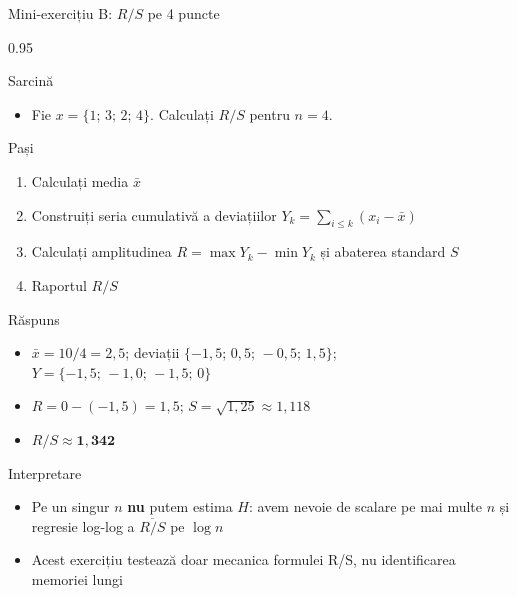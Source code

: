 \documentclass[9pt, aspectratio=169, t]{beamer}
\begin{document}
\begin{frame}[shrink=25]{Mini-exercițiu B: $R/S$ pe 4 puncte}
\begin{cminipage}{0.95\textwidth}
\begin{block}{Sarcină}
\begin{itemize}\setlength{\itemsep}{0pt}
    \item Fie $x=\{1;\,3;\,2;\,4\}$. Calculați $R/S$ pentru $n=4$.
\end{itemize}
\end{block}
\begin{block}{Pași}
\begin{enumerate}\setlength{\itemsep}{0pt}
    \item Calculați media $\bar x$
    \item Construiți seria cumulativă a deviațiilor $Y_k=\sum_{i\leq k}(x_i-\bar x)$
    \item Calculați amplitudinea $R=\max Y_k-\min Y_k$ și abaterea standard $S$
    \item Raportul $R/S$
\end{enumerate}
\end{block}
\begin{exampleblock}{Răspuns}
\begin{itemize}\setlength{\itemsep}{0pt}
    \item $\bar x=10/4=2{,}5$; deviații $\{-1{,}5;\,0{,}5;\,-0{,}5;\,1{,}5\}$; $Y=\{-1{,}5;\,-1{,}0;\,-1{,}5;\,0\}$
    \item $R=0-(-1{,}5)=1{,}5$; $S=\sqrt{1{,}25}\approx 1{,}118$
    \item $R/S\approx \mathbf{1{,}342}$
\end{itemize}
\end{exampleblock}
\begin{alertblock}{Interpretare}
\begin{itemize}\setlength{\itemsep}{0pt}
    \item Pe un singur $n$ \textbf{nu} putem estima $H$: avem nevoie de scalare pe mai multe $n$ și regresie log-log a $\overline{R/S}$ pe $\log n$
    \item Acest exercițiu testează doar mecanica formulei R/S, nu identificarea memoriei lungi
\end{itemize}
\end{alertblock}
\end{cminipage}
\end{frame}
\end{document}
